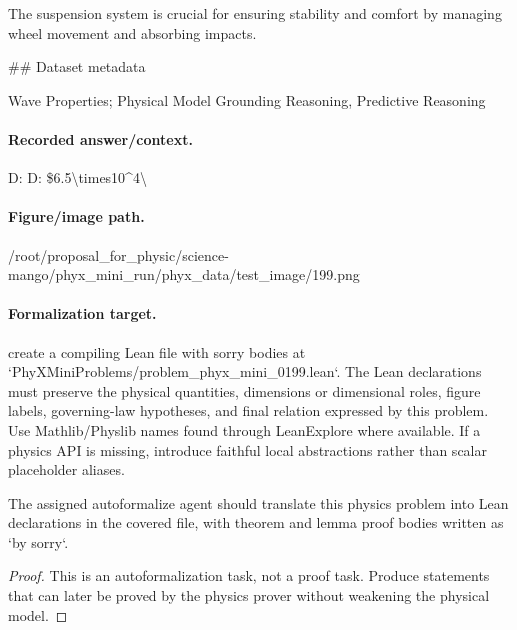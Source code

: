 The suspension system is crucial for ensuring stability and comfort by managing wheel movement and absorbing impacts.

\#\# Dataset metadata

Wave Properties; Physical Model Grounding Reasoning, Predictive Reasoning

\paragraph{Recorded answer/context.}
D: D: \$6.5\textbackslash{}times10\textasciicircum{}4\textbackslash{}

\paragraph{Figure/image path.}
/root/proposal\_for\_physic/science-mango/phyx\_mini\_run/phyx\_data/test\_image/199.png

\paragraph{Formalization target.}
create a compiling Lean file with sorry bodies at `PhyXMiniProblems/problem\_phyx\_mini\_0199.lean`. The Lean declarations must preserve the physical quantities, dimensions or dimensional roles, figure labels, governing-law hypotheses, and final relation expressed by this problem.
Use Mathlib/Physlib names found through LeanExplore where available. If a physics API is missing, introduce faithful local abstractions rather than scalar placeholder aliases.

\begin{theorem}
\label{thm:physics:phyx_mini_0199:target}
The assigned autoformalize agent should translate this physics problem into Lean declarations in the covered file, with theorem and lemma proof bodies written as `by sorry`.
\end{theorem}
\begin{proof}
This is an autoformalization task, not a proof task. Produce statements that can later be proved by the physics prover without weakening the physical model.
\end{proof}

